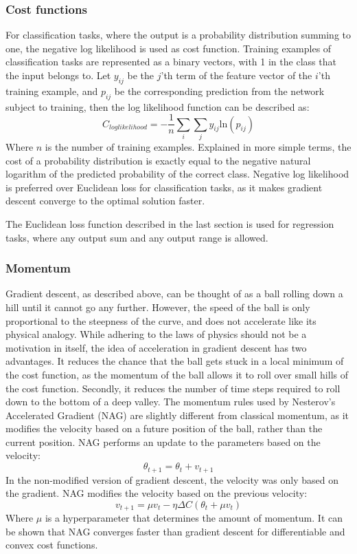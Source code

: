 \subsubsection{Cost functions}
\label{sec:negative}
For classification tasks, where the output is a probability distribution summing to one, the negative log likelihood is used as cost function. Training examples of classification tasks are represented as a binary vectors, with 1 in the class that the input belongs to. Let $y_{ij}$ be the $j$'th term of the feature vector of the $i$'th training example, and $p_{ij}$ be the corresponding prediction from the network subject to training, then the log likelihood function can be described as:
$$ C_{loglikelihood} = -\frac{1}{n} \sum_{i} \sum_{j} y_{ij}\text{ln}(p_{ij}) $$
Where $n$ is the number of training examples. Explained in more simple terms, the cost of a probability distribution is exactly equal to the negative natural logarithm of the predicted probability of the correct class. Negative log likelihood is preferred over Euclidean loss for classification tasks, as it makes gradient descent converge to the optimal solution faster\cite{Solla}.

The Euclidean loss function described in the last section is used for regression tasks, where any output sum and any output range is allowed.


\subsubsection{Momentum}
Gradient descent, as described above, can be thought of as a ball rolling down a hill until it cannot go any further. However, the speed of the ball is only proportional to the steepness of the curve, and does not accelerate like its physical analogy. While adhering to the laws of physics should not be a motivation in itself, the idea of acceleration in gradient descent has two advantages. It reduces the chance that the ball gets stuck in a local minimum of the cost function, as the momentum of the ball allows it to roll over small hills of the cost function. Secondly, it reduces the number of time steps required to roll down to the bottom of a deep valley. The momentum rules used by Nesterov's Accelerated Gradient (NAG) are slightly different from classical momentum, as it modifies the velocity based on a future position of the ball, rather than the current position. NAG performs an update to the parameters based on the velocity:
$$\theta_{t+1} = \theta_t + v_{t+1}$$
In the non-modified version of gradient descent, the velocity was only based on the gradient. NAG modifies the velocity based on the previous velocity:
$$v_{t+1} = \mu v_t - \eta \Delta C(\theta_t + \mu v_t)$$
Where $\mu$ is a hyperparameter that determines the amount of momentum. It can be shown that NAG converges faster than gradient descent for differentiable and convex cost functions.


